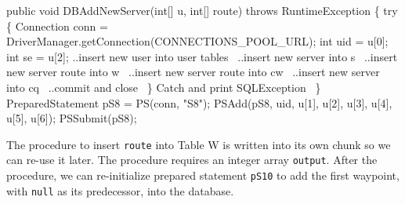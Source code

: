 \documentclass{article}
\def\nwendcode{\endtrivlist \endgroup}      %
\let\nwdocspar=\par
\theoremstyle{definition}                   %
\begin{document}
\nwenddocs{}\endmoddef{}
public void DBAddNewServer(int[] u, int[] route) throws RuntimeException \{
  try \{
    Connection conn = DriverManager.getConnection(CONNECTIONS_POOL_URL);
    int uid = u[0];
    int se = u[2];
    \LA{}..insert new user into user tables~{\nwtagstyle{}}\RA{}
    \LA{}..insert new server into s~{\nwtagstyle{}}\RA{}
    \LA{}..insert new server route into w~{\nwtagstyle{}}\RA{}
    \LA{}..insert new server route into cw~{\nwtagstyle{}}\RA{}
    \LA{}..insert new server into cq~{\nwtagstyle{}}\RA{}
    \LA{}..commit and close~{\nwtagstyle{}}\RA{}
  \}
  \LA{}Catch and print \code{}SQLException\edoc{}~{\nwtagstyle{}}\RA{}
\}
\eatline
{}\nwendcode{}\endmoddef{}
PreparedStatement pS8 = PS(conn, "S8");
PSAdd(pS8, uid, u[1], u[2], u[3], u[4], u[5], u[6]);
PSSubmit(pS8);
\nwendcode{}\nwdocspar
The procedure to insert {\tt{}route} into Table W is written into its own chunk so
we can re-use it later. The procedure requires an integer array {\tt{}output}.
After the procedure, we can re-initialize prepared statement {\tt{}pS10} to add the first
waypoint, with {\tt{}null} as its predecessor, into the database.
\nwenddocs{}\endmoddef{}
\end{document}
